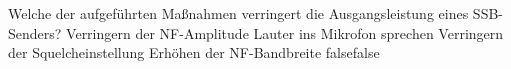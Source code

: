     {Welche der aufgeführten Maßnahmen verringert die Ausgangsleistung eines SSB-Senders?}
    {Verringern der NF-Amplitude}
    {Lauter ins Mikrofon sprechen }
    {Verringern der Squelcheinstellung }
    {Erhöhen der NF-Bandbreite}
    {false}{false}